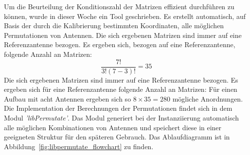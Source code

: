%

%
Um die Beurteilung der Konditionszahl der Matrizen effizient durchführen zu können, wurde in dieser Woche ein Tool geschrieben. Es erstellt automatisch, auf Basis der durch die Kalibrierung bestimmten Koordinaten, alle möglichen Permutationen von Antennen. Die sich ergebenen Matrizen sind immer auf eine Referenzantenne bezogen. Es ergeben sich, bezogen auf eine Referenzantenne, folgende Anzahl an Matrizen:
% 
\begin{equation}
	\frac{7!}{3!(7-3)!}=35
% 
\end{equation}
Die sich ergebenen Matrizen sind immer auf eine Referenzantenne bezogen. Es ergeben sich für eine Referenzantenne folgende Anzahl an Matrizen:
%
Für einen Aufbau mit acht Antennen ergeben sich so $8\times 35 = 280$ mögliche Anordnungen. Die Implementation der Berechnungen der Permutationen findet sich in dem Modul \textit{'libPermutate'}. Das Modul generiert bei der Instanziierung automatisch alle möglichen Kombinationen von Antennen und speichert diese in einer geeigneten Struktur für den späteren Gebrauch. Das Ablaufdiagramm ist in Abbildung~\ref{fig:libpermutate_flowchart} zu finden.\\
%



